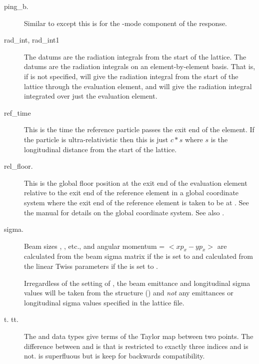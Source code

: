 \begin{description}
  \item[ping_b.] \Newline
Similar to  except this is for the -mode component of the response.

  \item[rad_int, rad_int1] \Newline
The  datums are the radiation integrals from the start of
the lattice. The  datums are the radiation integrals on
an element-by-element basis. That is, if  is not specified,
 will give the radiation integral from the start of the 
lattice through the evaluation element, and  will give
the radiation integral integrated over just the evaluation element.

  \item[ref_time] \Newline
This is the time the reference particle passes the exit end of the element.
If the particle is ultra-relativistic then this is just $c * s$ where $s$
is the longitudinal distance from the start of the lattice.

  \item[rel\_floor.] \Newline
This is the global floor position at the exit end of the evaluation
element relative to the exit end of the reference element in a global
coordinate system where the exit end of the reference element is taken to be at
. See the \bmad manual for details on
the global coordinate system. See also .

  \item[sigma.] \Newline
Beam sizes , , etc., and angular momentum
 = $<xp_x - yp_x>$ are calculated from the beam sigma matrix
if the  is set to  and calculated from the linear
Twiss parameters if the  is set to .

Irregardless of the setting of , the beam emittance and longitudinal sigma
values will be taken from the  structure () and {\em not}
any emittances or longitudinal sigma values specified in the lattice file.

  \item[t. tt.] \Newline
The  and  data types give terms of the Taylor map between
two points. The difference between  and  is that
 is restricted to exactly three indices and  is
not.  is superfluous but is keep for backwards compatibility.


\end{description}
